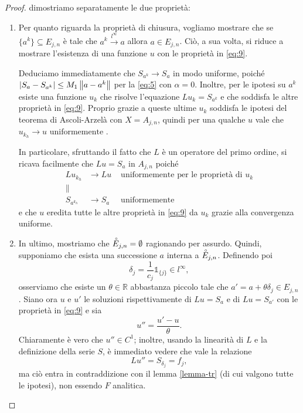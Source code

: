 \newpage
\begin{proof} 
dimostriamo separatamente le due proprietà:
\begin{enumerate}
\item
Per quanto riguarda la proprietà di chiusura, vogliamo mostrare che se $\{a^k\}\subseteq E_{j,n}$ è tale che $a^k \xrightarrow{l^\infty} a$ allora $a \in E_{j,n}$. Ciò, a sua volta, si riduce a mostrare l'esistenza di una funzione $u$ con le proprietà in \eqref{eq:9}.

Deduciamo immediatamente che $S_{a^k} \rightarrow S_a$ in modo uniforme, poiché $\left|S_a - S_{a^k}\right| \leq M_1 \left\lVert a-a^k\right\rVert$ per la \eqref{eq:5} con $\alpha = 0$. Inoltre, per le ipotesi su $a^k$ esiste una funzione $u_k$ che risolve l'equazione $Lu_k=S_{a^k}$ e che soddisfa le altre proprietà in \eqref{eq:9}. Proprio grazie a queste ultime $u_k$ soddisfa le ipotesi del teorema di Ascoli-Arzelà con $X=A_{j,n}$, quindi per una qualche $u$ vale che $u_{k_h} \rightarrow u \text{ uniformemente }$.

In particolare, sfruttando il fatto che $L$ è un operatore del primo ordine, si ricava facilmente che $Lu=S_a$ in $A_{j,n}$ poiché
\begin{align*}
Lu_{k_h}& \rightarrow Lu &\text{ uniformemente per le proprietà di } u_k\\
\lVert \quad &  &\\
S_{a^{k_h}}& \rightarrow S_a &\text{ uniformemente }
\end{align*}
e che $u$ eredita tutte le altre proprietà in \eqref{eq:9} da $u_k$ grazie alla convergenza uniforme.
 
\item
In ultimo, mostriamo che $\accentset{\circ}{E}_{j,n}=\emptyset$ ragionando per assurdo. Quindi, supponiamo che esista una successione $a$ interna a $\accentset{\circ}{E}_{j,n}$. Definendo poi
$$\delta_j = \frac{1}{c_j} \mathds{1}_{\{j\}} \in l^\infty,$$
osserviamo che esiste un $\theta \in \mathbb{R}$ abbastanza piccolo tale che $a'=a+\theta \delta_j \in E_{j,n}$.
Siano ora $u$ e $u'$ le soluzioni rispettivamente di $Lu=S_a$ e di $Lu=S_{a'}$ con le proprietà in \eqref{eq:9} e sia
$$u''=\frac{u'-u}{\theta}.$$ 
Chiaramente è vero che $u'' \in C^1$; inoltre, usando la linearità di $L$ e la definizione della serie $S$, è immediato vedere che vale la relazione $$Lu''=S_{\delta_j}=f_j,$$ ma ciò entra in contraddizione con il lemma \ref{lemma-tr} (di cui valgono tutte le ipotesi), non essendo $F$ analitica. 
\end{enumerate}
\end{proof}


